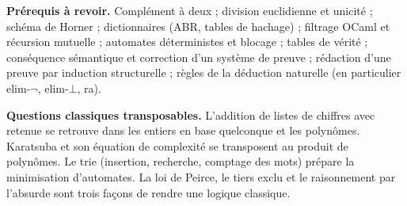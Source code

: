 \documentclass[11pt,a4paper]{article}
\begin{document}
\textbf{Prérequis à revoir.} Complément à deux ; division euclidienne et unicité ; schéma de Horner ; dictionnaires (ABR, tables de hachage) ; filtrage OCaml et récursion mutuelle ; automates déterministes et blocage ; tables de vérité ; conséquence sémantique et correction d'un système de preuve ; rédaction d'une preuve par induction structurelle ; règles de la déduction naturelle (en particulier elim-\(\neg\), elim-\(\bot\), ra).

\textbf{Questions classiques transposables.} L'addition de listes de chiffres avec retenue se retrouve dans les entiers en base quelconque et les polynômes. Karatsuba et son équation de complexité se transposent au produit de polynômes. Le trie (insertion, recherche, comptage des mots) prépare la minimisation d'automates. La loi de Peirce, le tiers exclu et le raisonnement par l'absurde sont trois façons de rendre une logique classique.
\end{document}
